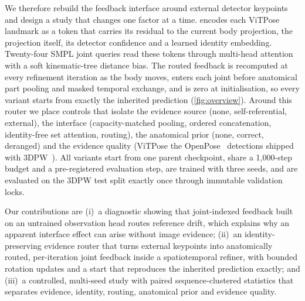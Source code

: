 We therefore rebuild the feedback interface around external detector keypoints and design a study that changes one factor at a time.
\method encodes each ViTPose~\cite{xu2022vitpose,xu2024vitposepp} landmark as a token that carries its residual to the current body projection, the projection itself, its detector confidence and a learned identity embedding.
Twenty-four SMPL joint queries read these tokens through multi-head attention with a soft kinematic-tree distance bias.
The routed feedback is recomputed at every refinement iteration as the body moves, enters each joint before anatomical part pooling and masked temporal exchange, and is zero at initialisation, so every variant starts from exactly the inherited prediction (\cref{fig:overview}).
Around this router we place controls that isolate the evidence source (none, self-referential, external), the interface (capacity-matched pooling, ordered concatenation, identity-free set attention, routing), the anatomical prior (none, correct, deranged) and the evidence quality (ViTPose \vs the OpenPose~\cite{cao2021openpose} detections shipped with 3DPW~\cite{vonmarcard2018pw3d}).
All variants start from one parent checkpoint, share a 1,000-step budget and a pre-registered evaluation step, are trained with three seeds, and are evaluated on the 3DPW test split exactly once through immutable validation locks.

Our contributions are
(i)~a diagnostic showing that joint-indexed feedback built on an untrained observation head routes reference drift, which explains why an apparent interface effect can arise without image evidence;
(ii)~an identity-preserving evidence router that turns external keypoints into anatomically routed, per-iteration joint feedback inside a spatiotemporal refiner, with bounded rotation updates and a start that reproduces the inherited prediction exactly;
and (iii)~a controlled, multi-seed study with paired sequence-clustered statistics that separates evidence, identity, routing, anatomical prior and evidence quality.
